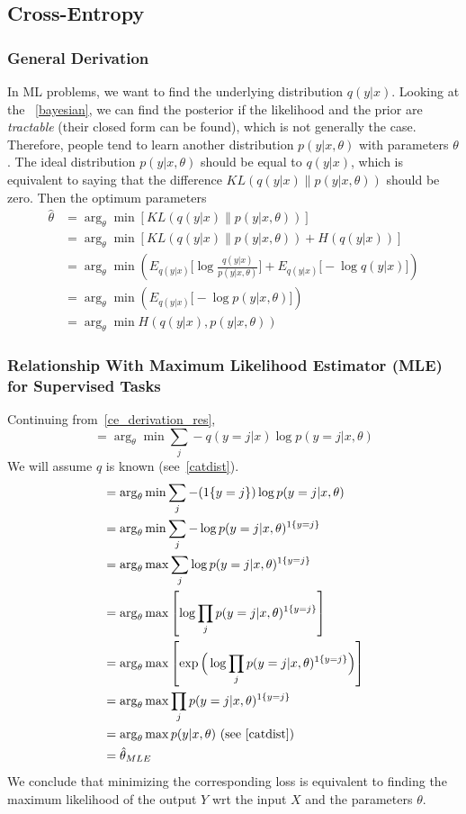 \documentclass{article}
\numberwithin{equation}{subsection}
\begin{document}
\subsection{Cross-Entropy}
\subsubsection{General Derivation}
\label{ce_derivation}
In ML problems, we want to find the underlying distribution $q(y|x)$. Looking at the ~\ref{bayesian}, we can find the posterior if the likelihood and the prior are \textit{tractable} (their closed form can be found), which is not generally the case. Therefore, people tend to learn another distribution $p(y|x,\theta)$ with parameters $\theta$. The ideal distribution $p(y|x,\theta)$ should be equal to $q(y|x)$, which is equivalent to saying that the difference $KL(q(y|x)\parallel p(y|x,\theta))$ should be zero. Then the optimum parameters
\begin{align}
    \hat{\theta} 
    &= \arg_\theta \min[KL(q(y|x) \parallel p(y|x,\theta))]\\
    &= \arg_\theta \min[ KL(q(y|x) \parallel p(y|x,\theta)) + H(q(y|x))]\\
    &= \arg_\theta \min \left( E_{q(y|x)}\Big[\log\frac{q(y|x)}{p(y|x,\theta)}\Big] + E_{q(y|x)}\Big[-\log q(y|x)\Big]\right)\\
    &= \arg_\theta \min \left( E_{q(y|x)}\Big[-\log p(y|x,\theta)\Big]\right)\label{ce_derivation_res}\\
    &= \arg_\theta \min H(q(y|x), p(y|x,\theta))
\end{align}
\subsubsection{Relationship With Maximum Likelihood Estimator (MLE) for Supervised Tasks}
\label{mle_ce}
Continuing from~\ref{ce_derivation_res}, 
\begin{equation}
    = \arg_\theta \min \sum_j -q(y=j|x)\log p(y=j|x,\theta)
\end{equation}
We will assume $q$ is known (see~\ref{catdist}).
\begin{align}
    &= \arg_\theta \min \sum_j -(1\{y=j\})\log p(y=j|x,\theta)\\
    &= \arg_\theta \min \sum_j -\log p(y=j|x,\theta)^{1\{y=j\}}\\
    &= \arg_\theta \max \sum_j \log p(y=j|x,\theta)^{1\{y=j\}}\\
    &= \arg_\theta \max\left[\log\prod_j p(y=j|x,\theta)^{1\{y=j\}}\right]\\
    &= \arg_\theta \max\left[\exp\Big(\log\prod_j p(y=j|x,\theta)^{1\{y=j\}}\Big)\right]\\
    &= \arg_\theta \max\prod_j p(y=j|x,\theta)^{1\{y=j\}}\\
    &= \arg_\theta\max p(y|x,\theta) \ \text{(see~\ref{catdist})}\\
    &= \hat{\theta}_{MLE}\label{mle_ce_res}
\end{align}
We conclude that minimizing the corresponding loss is equivalent to finding the maximum likelihood of the output $Y$ wrt the input $X$ and the parameters $\theta$. 
\end{document}
